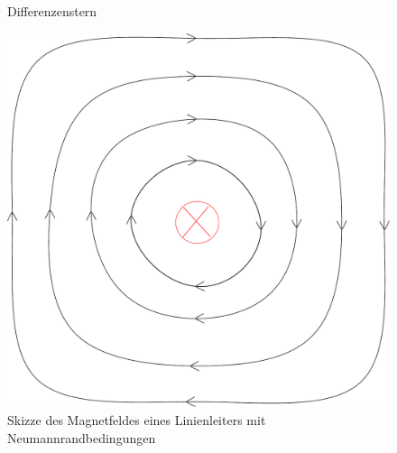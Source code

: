 \documentclass[Protokollheft.tex]{subfiles}
\begin{document}
\begin{figure}[ht]
	\centering
	\def\svgwidth{0.7\textwidth}
	
	\caption{Differenzenstern}
	\label{fig:diffstern}
\end{figure}
\begin{figure}
	\centering
	\includegraphics[width=0.5\linewidth]{versuch4/NeumannRand}
	\caption{Skizze des Magnetfeldes eines Linienleiters mit Neumannrandbedingungen}
	\label{fig:neumannrand}
\end{figure}
\end{document}
